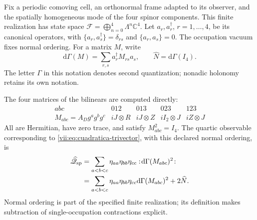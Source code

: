 Fix a periodic comoving cell, an orthonormal frame adapted to its
observer, and the spatially homogeneous mode of the four spinor
components. This finite realization has state space
\(\mathcal F=\bigoplus_{n=0}^4\Lambda^n\mathbb C^4\).
Let \(a_r,a_r^\dagger\), \(r=1,\ldots,4\), be its canonical
operators, with
\(\{a_r,a_s^\dagger\}=\delta_{rs}\) and
\(\{a_r,a_s\}=0\). The occupation vacuum fixes normal ordering.
For a matrix \(M\), write
\[
 \mathrm d\Gamma(M)=\sum_{r,s}a_r^\dagger M_{rs}a_s,
 \qquad \widehat N=\mathrm d\Gamma(I_4).
\]
The letter \(\Gamma\) in this notation denotes second
quantization; nonadic holonomy retains its own notation.

The four matrices of the bilinears are computed directly:
\begin{equation}
 \begin{array}{c|cccc}
 abc&012&013&023&123\\ \hline
 M_{abc}=A_Dg^ag^bg^c
       &iJ\otimes R&iJ\otimes Z&iI_2\otimes J&iZ\otimes J
 \end{array}
 \label{vii:eq:matrices-bilineales-espin}
\end{equation}
All are Hermitian, have zero trace, and satisfy
\(M_{abc}^2=I_4\). The quartic observable corresponding to
\eqref{vii:eq:cuadratica-trivector}, with this declared normal
ordering, is
\begin{equation}
 \begin{split}
 \widehat{\mathscr Q}_{\rm sp}
 &=\sum_{a<b<c}\eta_{aa}\eta_{bb}\eta_{cc}
       :\!\mathrm d\Gamma(M_{abc})^2\!:\\
 &=\sum_{a<b<c}\eta_{aa}\eta_{bb}\eta_{cc}
       \mathrm d\Gamma(M_{abc})^2+2\widehat N.
 \end{split}
 \label{vii:eq:observable-cuadratico-espin}
\end{equation}
Normal ordering is part of the specified finite realization; its
definition makes subtraction of single-occupation contractions explicit.


